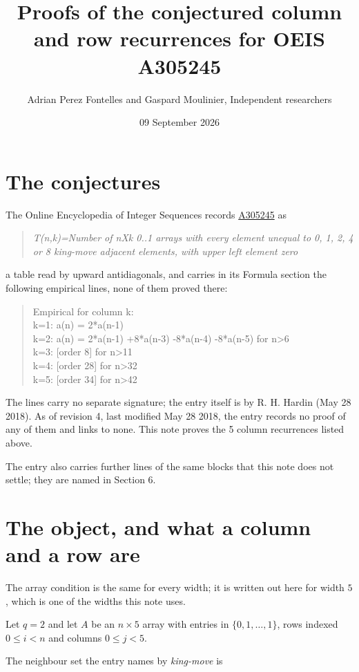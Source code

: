 \documentclass[11pt]{article}
\title{Proofs of the conjectured column and row recurrences for OEIS A305245}
\author{Adrian Perez Fontelles and Gaspard Moulinier, Independent researchers}
\date{09 September 2026}
\theoremstyle{definition}
\begin{document}
\maketitle
\section{The conjectures}

The Online Encyclopedia of Integer Sequences records \href{https://oeis.org/A305245}{A305245} as

\begin{quote}\itshape T(n,k)=Number of nXk 0..1 arrays with every element unequal to 0, 1, 2, 4 or 8 king-move adjacent elements, with upper left element zero\end{quote}

a table read by upward antidiagonals, and carries in its Formula section the following empirical lines, none of them proved there:

\begin{quote}\ttfamily Empirical for column k:\\
k=1: a(n) = 2*a(n-1)\\k=2: a(n) = 2*a(n-1) +8*a(n-3) -8*a(n-4) -8*a(n-5) for n>6\\k=3: [order 8] for n>11\\k=4: [order 28] for n>32\\k=5: [order 34] for n>42\end{quote}

The lines carry no separate signature; the entry itself is by R. H. Hardin (May 28 2018). As of revision 4, last modified May 28 2018, the entry records no proof of any of them and links to none. This note proves the 5 column recurrences listed above.

The entry also carries further lines of the same blocks that this note does not settle; they are named in Section 6.

\section{The object, and what a column and a row are}

The array condition is the same for every width; it is written out here for width $5$, which is one of the widths this note uses.

Let $q = 2$ and let $A$ be an $n \times 5$ array with entries in $\{0,1,\dots,1\}$, rows indexed $0 \le i < n$ and columns $0 \le j < 5$.

The neighbour set the entry names by {\itshape king-move} is
\end{document}
